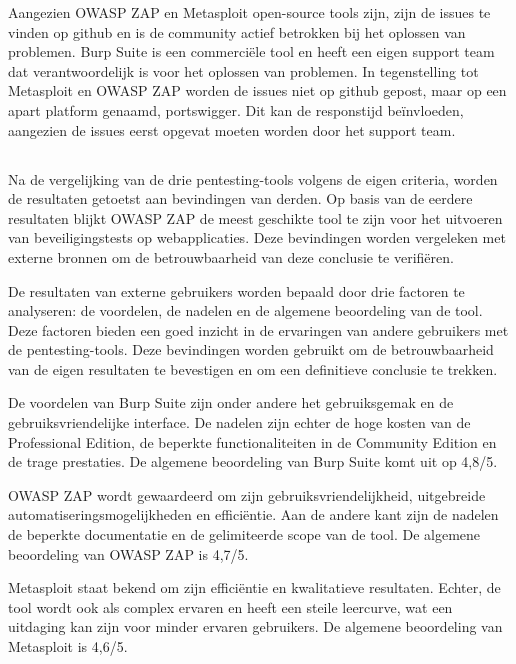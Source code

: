 Aangezien OWASP ZAP en Metasploit open-source tools zijn, zijn de issues te vinden op github en is de community actief
betrokken bij het oplossen van problemen. Burp Suite is een commerciële tool en heeft een eigen support team dat 
verantwoordelijk is voor het oplossen van problemen. In tegenstelling tot Metasploit en OWASP ZAP worden de issues niet 
op github gepost, maar op een apart platform genaamd, portswigger. Dit kan de responstijd beïnvloeden, 
aangezien de issues eerst opgevat moeten worden door het support team.

\subsection{}
Na de vergelijking van de drie pentesting-tools volgens de eigen criteria, worden de resultaten getoetst aan bevindingen van 
derden. Op basis van de eerdere resultaten blijkt OWASP ZAP de meest geschikte tool te zijn voor het uitvoeren van 
beveiligingstests op webapplicaties. Deze bevindingen worden vergeleken met externe bronnen om de betrouwbaarheid van deze 
conclusie te verifiëren.

De resultaten van externe gebruikers worden bepaald door drie factoren te analyseren: de voordelen, de nadelen en de algemene 
beoordeling van de tool. Deze factoren bieden een goed inzicht in de ervaringen van andere gebruikers met de pentesting-tools. 
Deze bevindingen worden gebruikt om de betrouwbaarheid van de eigen resultaten te bevestigen en om een definitieve conclusie 
te trekken.

De voordelen van Burp Suite zijn onder andere het gebruiksgemak en de gebruiksvriendelijke interface. De nadelen zijn echter 
de hoge kosten van de Professional Edition, de beperkte functionaliteiten in de Community Edition en de trage prestaties. De 
algemene beoordeling van Burp Suite komt uit op 4,8/5.

OWASP ZAP wordt gewaardeerd om zijn gebruiksvriendelijkheid, uitgebreide automatiseringsmogelijkheden en efficiëntie. Aan de 
andere kant zijn de nadelen de beperkte documentatie en de gelimiteerde scope van de tool. De algemene beoordeling van OWASP 
ZAP is 4,7/5.

Metasploit staat bekend om zijn efficiëntie en kwalitatieve resultaten. Echter, de tool wordt ook als complex ervaren en 
heeft een steile leercurve, wat een uitdaging kan zijn voor minder ervaren gebruikers. De algemene beoordeling van Metasploit 
is 4,6/5.

